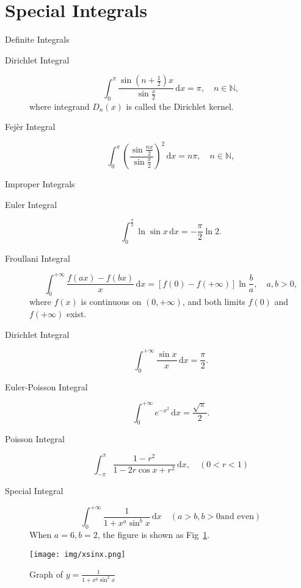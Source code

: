 \documentclass[11pt]{../../TexTemplate/elegantbook}
\begin{document}
\section{Special Integrals}
\begin{leftbarTitle}{Definite Integrals}\end{leftbarTitle}
\begin{description}
    \item[Dirichlet Integral] 
        \[
        \int_{0}^{\pi} \frac{\sin \left( n+\frac{1}{2} \right)x }{\sin \frac{x}{2}} \, \mathrm{d}x = \pi,\quad n \in \mathbb{N},
        \]
        where integrand \(D_{n}(x)\) is called the Dirichlet kernel. 
    \item[Fejèr Integral]
        \[
        \int_{0}^{\pi} \left( \frac{\sin \frac{n x}{2}}{\sin \frac{x}{2}} \right)^2 \, \mathrm{d}x = n\pi, \quad n \in \mathbb{N},
        \] 
\end{description}
\begin{leftbarTitle}{Improper Integrals}\end{leftbarTitle}
\begin{description}
    \item[Euler Integral]
        \[
        \int_{0}^{\frac{\pi}{2}} \ln \sin x \, \mathrm{d}x= - \frac{\pi}{2} \ln 2.
        \]
    \item[Froullani Integral]
        \[
        \int_{0}^{+\infty} \frac{f(ax) - f(bx)}{x} \, \mathrm{d}x = [f(0) - f(+\infty)] \ln \frac{b}{a}, \quad a, b > 0,
        \]
        where \( f(x) \) is continuous on \( (0, +\infty) \), and both limits \( f(0) \) and \( f(+\infty) \) exist.
    \item[Dirichlet Integral]
        \[
        \int_{0}^{+\infty} \frac{\sin x}{x} \, \mathrm{d}x = \frac{\pi}{2}.
        \]
    \item[Euler-Poisson Integral]
        \[
        \int_{0}^{+\infty} e^{-x^2} \, \mathrm{d}x = \frac{\sqrt{\pi}}{2}.
        \]
    \item[Poisson Integral]
        \[
        \int_{-\pi}^{\pi} \frac{1-r^2}{1-2r\cos x+r^2} \, \mathrm{d}x,\quad(0<r<1)
        \]
    \item [Special Integral]
    \[
    \int_{0}^{+ \infty} \frac{1}{1+x^a\sin^bx} \, \mathrm{d}x \quad (a > b, b > 0 \text{and even})
    \]
    When \( a = 6, b = 2\), the figure is shown as Fig~\ref{fig:graph of the special integral}.
\end{description}

\begin{figure}[h]
    \centering
    \texttt{[image: img/xsinx.png]}
    \caption{Graph of \( y = \frac{1}{1 + x^6 \sin^2 x} \)}
    \label{fig:graph of the special integral}
\end{figure}
\end{document}
